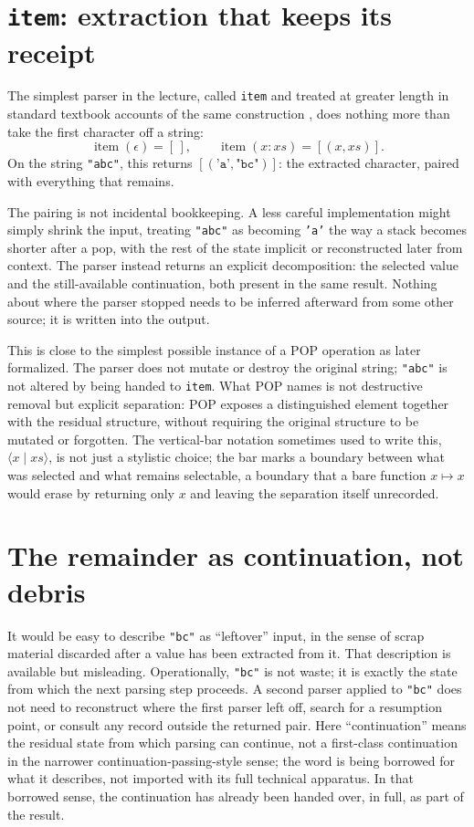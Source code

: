 \documentclass[11pt]{article}
\begin{document}
\section{\texttt{item}: extraction that keeps its receipt}

The simplest parser in the lecture, called \texttt{item} and treated at greater length in standard textbook accounts of the same construction \cite{hutton-2016}, does nothing more than take the first character off a string:
\[
\operatorname{item}(\epsilon) = [\,], \qquad \operatorname{item}(x:xs) = [(x, xs)].
\]
On the string \texttt{"abc"}, this returns $[(\texttt{'a'}, \texttt{"bc"})]$: the extracted character, paired with everything that remains.

The pairing is not incidental bookkeeping. A less careful implementation might simply shrink the input, treating \texttt{"abc"} as becoming \texttt{'a'} the way a stack becomes shorter after a pop, with the rest of the state implicit or reconstructed later from context. The parser instead returns an explicit decomposition: the selected value and the still-available continuation, both present in the same result. Nothing about where the parser stopped needs to be inferred afterward from some other source; it is written into the output.

This is close to the simplest possible instance of a POP operation as later formalized. The parser does not mutate or destroy the original string; \texttt{"abc"} is not altered by being handed to \texttt{item}. What POP names is not destructive removal but explicit separation: POP exposes a distinguished element together with the residual structure, without requiring the original structure to be mutated or forgotten. The vertical-bar notation sometimes used to write this, $\langle x \mid xs\rangle$, is not just a stylistic choice; the bar marks a boundary between what was selected and what remains selectable, a boundary that a bare function $x \mapsto x$ would erase by returning only $x$ and leaving the separation itself unrecorded.

\section{The remainder as continuation, not debris}

It would be easy to describe \texttt{"bc"} as ``leftover'' input, in the sense of scrap material discarded after a value has been extracted from it. That description is available but misleading. Operationally, \texttt{"bc"} is not waste; it is exactly the state from which the next parsing step proceeds. A second parser applied to \texttt{"bc"} does not need to reconstruct where the first parser left off, search for a resumption point, or consult any record outside the returned pair. Here ``continuation'' means the residual state from which parsing can continue, not a first-class continuation in the narrower continuation-passing-style sense; the word is being borrowed for what it describes, not imported with its full technical apparatus. In that borrowed sense, the continuation has already been handed over, in full, as part of the result.
\end{document}
